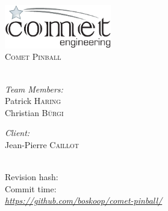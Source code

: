 \begin{titlepage}

\begin{center}

\includegraphics[width=0.35\textwidth]{./comet-logo.eps}\\[2.5cm]    

\textsc{\Large Comet Pinball}\\[2cm]

{ \huge \bfseries \doctitle{}}\\[3cm]

\begin{minipage}{0.45\textwidth}
\begin{flushleft} \large
\emph{Team Members:}\\
Patrick \textsc{Haring}\\
Christian \textsc{Bürgi}
\end{flushleft}
\end{minipage}
\begin{minipage}{0.45\textwidth}
\begin{flushright} \large
\emph{Client:} \\
Jean-Pierre \textsc{Caillot}\\
~
\end{flushright}
\end{minipage}

\vfill

{\large 
Revision hash: \gitAbbrevHash \\[0.2cm]
Commit time: \gitCommitterIsoDate \\[0.2cm]
{\footnotesize \itshape \url{https://github.com/boskoop/comet-pinball/}}}

\end{center}

\end{titlepage}
